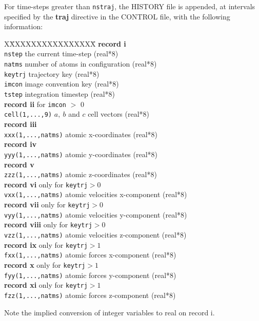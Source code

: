 For time-steps greater than {\tt nstraj}, the HISTORY file is appended, at
intervals specified by the {\bf traj} directive in the CONTROL file,
with the following information:

\begin{tabbing}
X\=XXXXXXXXXXXXXXXX\=\kill
{\bf record i}\\
\> {\tt nstep} \> the current time-step (real*8)\\
\> {\tt natms} \> number of atoms in configuration (real*8)\\
\> {\tt keytrj} \> trajectory key (real*8)\\
\> {\tt imcon} \> image convention key (real*8)\\
\> {\tt tstep} \> integration timestep (real*8) \\
{\bf record ii} for {\tt imcon} $>$ 0\\
\> {\tt cell(1,...,9)} \> $a,~b$ and $c$  cell vectors (real*8)\\
{\bf record iii}\\
\> {\tt xxx(1,...,natms)} \> atomic x-coordinates (real*8)\\
{\bf record iv}\\
\> {\tt yyy(1,...,natms)} \> atomic y-coordinates (real*8)\\
{\bf record v}\\
\> {\tt zzz(1,...,natms)} \> atomic z-coordinates (real*8)\\
{\bf record vi} only for {\tt keytrj}$>0$\\
\> {\tt vxx(1,...,natms)} \> atomic velocities x-component (real*8)\\
{\bf record vii} only for {\tt keytrj}$>0$\\
\> {\tt vyy(1,...,natms)} \> atomic velocities y-component (real*8)\\
{\bf record viii} only for {\tt keytrj}$>0$\\
\> {\tt vzz(1,...,natms)} \> atomic velocities z-component (real*8)\\
{\bf record ix} only for {\tt keytrj}$>1$\\
\> {\tt fxx(1,...,natms)} \> atomic forces x-component (real*8)\\
{\bf record x} only for {\tt keytrj}$>1$\\
\> {\tt fyy(1,...,natms)} \> atomic forces y-component (real*8)\\
{\bf record xi} only for {\tt keytrj}$>1$\\
\> {\tt fzz(1,...,natms)} \> atomic forces z-component (real*8)\\
\end{tabbing}
Note the implied conversion of integer variables to real on record i.

